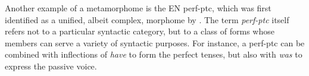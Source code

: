 

Another example of a metamorphome is the \ac{EN} \ac{perf-ptc}, which was first 
identified as a unified, albeit complex, morphome by \cite{aronoff:1994}. The term \emph{\ac{perf-ptc}} 
itself refers not to a particular syntactic category, but 
to a class of 
forms whose members 
can serve a variety of  syntactic purposes. For instance, a \ac{perf-ptc} can be combined
with inflections of \emph{have} to form the perfect tenses, but also with 
\emph{was} to express the passive voice. 

